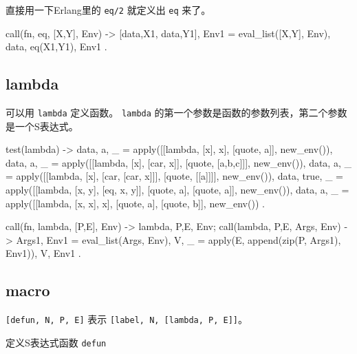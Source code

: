 \documentclass[preview,multi,crop=false,border=1in,class=memoir]{standalone}
\begin{document}
\begin{preview-page}
直接用一下Erlang里的 \verb|eq/2| 就定义出 \verb|eq| 来了。

\begin{SourceCode}
call({fn, eq}, [X,Y], Env) ->
    {[{data,X1}, {data,Y1}], Env1} =
        eval_list([X,Y], Env),
    {{data, eq(X1,Y1)}, Env1}
.
\end{SourceCode}

\subsection{lambda}

可以用 \verb|lambda| 定义函数。 \verb|lambda| 的第一个参数是函数的参数列表，第二个参数是一个S表达式。

\begin{SourceCode}
test(lambda) ->
    {{data, a}, _} =
        apply([[lambda, [x], x],
               [quote, a]], new_env()),
    {{data, a}, _} =
        apply([[lambda, [x], [car, x]],
               [quote, [a,b,c]]], new_env()),
    {{data, a}, _} =
        apply([[lambda, [x], [car, [car, x]]],
               [quote, [[a]]]], new_env()),
    {{data, true}, _} =
        apply([[lambda, [x, y], [eq, x, y]],
               [quote, a],
               [quote, a]], new_env()),
    {{data, a}, _} =
        apply([[lambda, [x, x], x],
               [quote, a],
               [quote, b]], new_env())
.
\end{SourceCode}


\begin{SourceCode}
call({fn, lambda}, [P,E], Env) ->
    {{lambda, {P,E}}, Env};
call({lambda, {P,E}}, Args, Env) ->
    {Args1, Env1} = eval_list(Args, Env),
    {V, _} = apply(E, append(zip(P, Args1), Env1)),
    {V, Env1}
.
\end{SourceCode}


\subsection{macro}

\begin{Exercise}[title={defun},difficulty=1]
\verb|[defun, N, P, E]| 表示 \verb|[label, N, [lambda, P, E]]|\cite{Graham:2001:roots}。

定义S表达式函数 \verb|defun|


\end{Exercise}
\end{preview-page}
\end{document}
